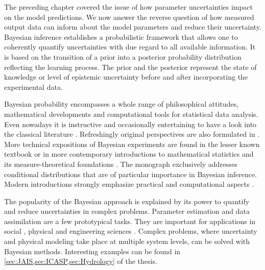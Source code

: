The preceding chapter covered the issue of how parameter uncertainties impact on the model predictions.
We now answer the reverse question of how measured output data can inform about the model parameters and reduce their uncertainty.
Bayesian inference establishes a probabilistic framework that allows one to coherently quantify uncertainties with due regard to all available information.
It is based on the transition of a prior into a posterior probability distribution reflecting the learning process.
The prior and the posterior represent the state of knowledge or level of epistemic uncertainty before and after incorporating the experimental data.
\par %
Bayesian probability encompasses a whole range of philosophical attitudes, mathematical developments and computational tools for statistical data analysis.
Even nowadays it is instructive and occasionally entertaining to have a look into the classical literature \cite{Bayesian:Jeffreys1961,Bayesian:DeFinetti1974}.
Refreshingly original perspectives are also formulated in \cite{Bayesian:Jaynes2003,Bayesian:MacKay2003}.
More technical expositions of Bayesian experiments are found in the lesser known textbook \cite{Bayesian:Florens1990}
or in more contemporary introductions to mathematical statistics \cite{Statistics:Shao2003,Statistics:Keener2010}
and its measure-theoretical foundations \cite{Statistics:Shorack2000,Statistics:Athreya2006}.
The monograph \cite{Probability:Rao2005} exclusively addresses conditional distributions that are of particular importance in Bayesian inference.
Modern introductions strongly emphasize practical and computational aspects \cite{Bayesian:Gelman2014:3rd,Bayesian:McElreath2016}.
\par %
The popularity of the Bayesian approach is explained by its power to quantify and reduce uncertainties in complex problems.
Parameter estimation \cite{Inversion:Aster2012,Inversion:Sun2015} and data assimilation \cite{Bayesian:Reich2015,Bayesian:Law2015} are a few prototypical tasks.
They are important for applications in social \cite{Bayesian:Jackman2009,Bayesian:Gill2015}, physical \cite{Bayesian:Linden2014,Bayesian:Andreon2015}
and engineering sciences \cite{Bayesian:Yuen2010:a,Bayesian:Nichols2016}.
Complex problems, where uncertainty \cite{Multilevel:Wu2015,Multilevel:Behmanesh2016,Multilevel:Mullins2016} and physical modeling
\cite{Bayesian:Sankararaman2015,Bayesian:Li2016} take place at multiple system levels, can be solved with Bayesian methods.
Interesting examples can be found in \cref{sec:JAIS,sec:ICASP,sec:Hydrology} of the thesis.

